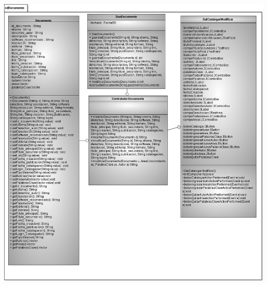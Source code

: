 \documentclass[]{article}
\begin{document}
			\begin{minipage}[c]{1\linewidth}
				\centering
				\includegraphics[width=17cm, height=20cm]{DiagramasClase/Documentos}
			\end{minipage}	
		
\end{document}
